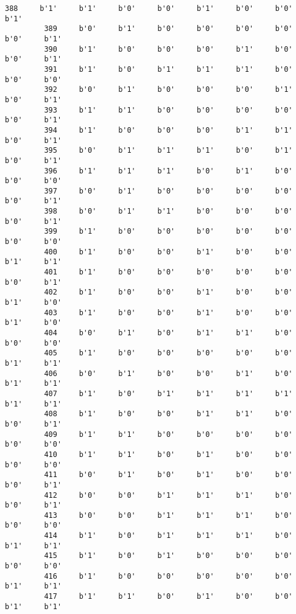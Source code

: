 \documentclass[11pt]{article}
\begin{document}
\begin{Verbatim}[commandchars=\\\{\}]
         388     b'1'     b'1'     b'0'     b'0'     b'1'     b'0'     b'0'     b'1'   
         389     b'0'     b'1'     b'0'     b'0'     b'0'     b'0'     b'0'     b'1'   
         390     b'1'     b'0'     b'0'     b'0'     b'1'     b'0'     b'0'     b'1'   
         391     b'1'     b'0'     b'1'     b'1'     b'1'     b'0'     b'0'     b'0'   
         392     b'0'     b'1'     b'0'     b'0'     b'0'     b'1'     b'0'     b'1'   
         393     b'1'     b'1'     b'0'     b'0'     b'0'     b'0'     b'0'     b'1'   
         394     b'1'     b'0'     b'0'     b'0'     b'1'     b'1'     b'0'     b'1'   
         395     b'0'     b'1'     b'1'     b'1'     b'0'     b'1'     b'0'     b'1'   
         396     b'1'     b'1'     b'1'     b'0'     b'1'     b'0'     b'0'     b'0'   
         397     b'0'     b'1'     b'0'     b'0'     b'0'     b'0'     b'0'     b'1'   
         398     b'0'     b'1'     b'1'     b'0'     b'0'     b'0'     b'0'     b'1'   
         399     b'1'     b'0'     b'0'     b'0'     b'0'     b'0'     b'0'     b'0'   
         400     b'1'     b'0'     b'0'     b'1'     b'0'     b'0'     b'1'     b'1'   
         401     b'1'     b'0'     b'0'     b'0'     b'0'     b'0'     b'0'     b'1'   
         402     b'1'     b'0'     b'0'     b'1'     b'0'     b'0'     b'1'     b'0'   
         403     b'1'     b'0'     b'0'     b'1'     b'0'     b'0'     b'1'     b'0'   
         404     b'0'     b'1'     b'0'     b'1'     b'1'     b'0'     b'0'     b'0'   
         405     b'1'     b'0'     b'0'     b'0'     b'0'     b'0'     b'1'     b'1'   
         406     b'0'     b'1'     b'0'     b'0'     b'1'     b'0'     b'1'     b'1'   
         407     b'1'     b'0'     b'1'     b'1'     b'1'     b'1'     b'1'     b'1'   
         408     b'1'     b'0'     b'0'     b'1'     b'1'     b'0'     b'0'     b'1'   
         409     b'1'     b'1'     b'0'     b'0'     b'0'     b'0'     b'0'     b'0'   
         410     b'1'     b'1'     b'0'     b'1'     b'0'     b'0'     b'0'     b'0'   
         411     b'0'     b'1'     b'0'     b'1'     b'0'     b'0'     b'0'     b'1'   
         412     b'0'     b'0'     b'1'     b'1'     b'1'     b'0'     b'0'     b'1'   
         413     b'0'     b'0'     b'1'     b'1'     b'1'     b'0'     b'0'     b'0'   
         414     b'1'     b'0'     b'1'     b'1'     b'1'     b'0'     b'1'     b'1'   
         415     b'1'     b'0'     b'1'     b'0'     b'0'     b'0'     b'0'     b'0'   
         416     b'1'     b'0'     b'0'     b'0'     b'0'     b'0'     b'1'     b'1'   
         417     b'1'     b'1'     b'0'     b'1'     b'0'     b'0'     b'1'     b'1'   

\end{Verbatim}
\end{document}
